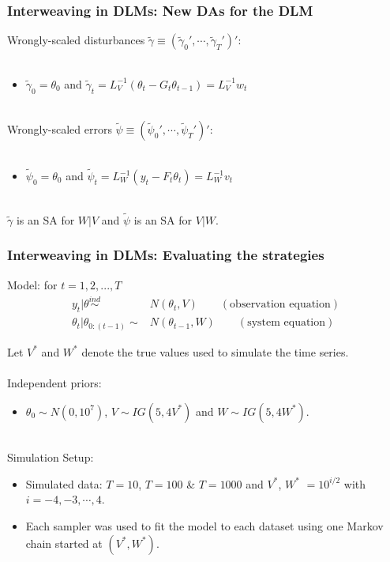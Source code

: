 \documentclass[xcolor=dvipsnames]{beamer}
\begin{document}
\begin{frame}
\frametitle{Interweaving in DLMs: New DAs for the DLM}
Wrongly-scaled disturbances $\tilde{\gamma}\equiv(\tilde{\gamma}_0',\cdots,\tilde{\gamma}_T')'$:\\~\\
\begin{itemize}
\item[]$\tilde{\gamma}_0=\theta_0$ and $\tilde{\gamma}_t=L_V^{-1}(\theta_t - G_t\theta_{t-1})=L_V^{-1}w_t$\\~\\
\end{itemize}

Wrongly-scaled errors $\tilde{\psi}\equiv(\tilde{\psi}_0',\cdots,\tilde{\psi}_T')'$:\\~\\
\begin{itemize}
\item[]$\tilde{\psi}_0=\theta_0$ and $\tilde{\psi}_t=L_W^{-1}(y_t - F_t\theta_{t})=L_W^{-1}v_t$\\~\\
\end{itemize}

{\color{blue} $\tilde{\gamma}$ is an SA for $W|V$ and $\tilde{\psi}$ is an SA for $V|W$.}
\end{frame}

\begin{frame}[fragile]
\frametitle{Interweaving in DLMs: Evaluating the strategies}
Model: for $t=1,2,...,T$
\begin{align*}
    y_t|\theta  \stackrel{ind}{\sim}&N(\theta_t,V) \qquad (\mbox{observation equation})\\
    \theta_t|\theta_{0:(t-1)} \sim& N(\theta_{t-1},W) \qquad (\mbox{system equation})
  \end{align*} 

Let $V^*$ and $W^*$ denote the true values used to simulate the time series.\\~\\

Independent priors:
\begin{itemize}
\item $\theta_0\sim N(0, 10^7)$, $V\sim IG(5, 4V^*)$ and $W\sim IG(5, 4W^*)$.\\~\\
\end{itemize}

Simulation Setup:
\begin{itemize}
\item Simulated data: $T=10$, $T=100$ \& $T=1000$ and $V^*$, $W^*$ $=10^{i/2}$ with $i=-4,-3,\cdots,4$.
\item Each sampler was used to fit the model to each dataset using one Markov chain started at $(V^*,W^*)$.
\end{itemize}


\end{frame}
\end{document}
